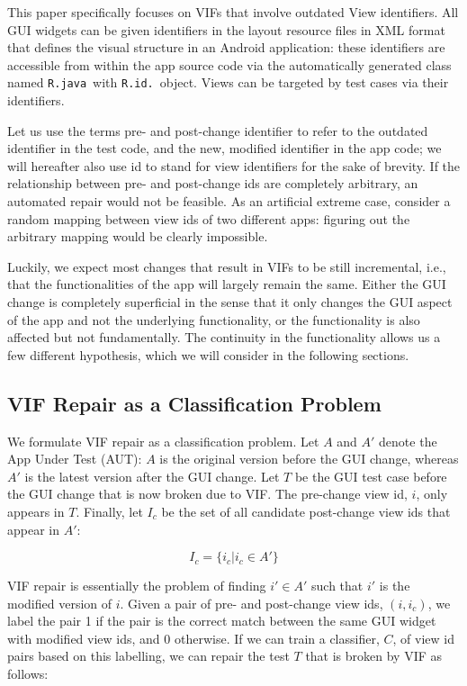 \documentclass[sigconf]{acmart}
\begin{document}
This paper specifically focuses on VIFs that involve outdated View
identifiers. All GUI widgets can be given identifiers in the layout resource files in XML format
that defines the visual structure in an Android application: these identifiers are accessible from within
the app source code via the automatically generated class named \lstinline+R.java+\ with \lstinline+R.id.+\ object. Views can be targeted by test cases via their identifiers.

Let us use the terms pre- and post-change identifier to refer to the outdated
identifier in the test code, and the new, modified identifier in the app code;
we will hereafter also use id to stand for view identifiers for the sake of
brevity. If the relationship between pre- and post-change ids are completely
arbitrary, an automated repair would not be feasible. As an artificial extreme
case, consider a random mapping between view ids of two different apps:
figuring out the arbitrary mapping would be clearly impossible.

Luckily, we expect most changes that result in VIFs to be still incremental,
i.e., that the functionalities of the app will largely remain the same. Either
the GUI change is completely superficial in the sense that it only changes the
GUI aspect of the app and not the underlying functionality, or the
functionality is also affected but not fundamentally. The continuity in the
functionality allows us a few different hypothesis, which we will consider in
the following sections.

\subsection{VIF Repair as a Classification Problem}
\label{sec:classification}

We formulate VIF repair as a classification problem. Let $A$ and $A'$ denote the App Under Test (AUT): $A$ is the original version before the GUI change, whereas $A'$ is the latest version after the GUI change. Let $T$ be the GUI test case before the GUI change that is now broken due to VIF. The pre-change view id, $i$, only appears in $T$. Finally, let $I_c$ be the set of all candidate post-change view ids that appear in $A'$:

\[I_c = \{i_c | i_c \in A'\}\]

VIF repair is essentially the problem of finding $i' \in A'$ such that $i'$ is
the modified version of $i$. Given a pair of pre- and post-change view ids,
$(i, i_c)$, we label the pair 1 if the pair is the correct match between the
same GUI widget with modified view ids, and 0 otherwise. If we can train a
classifier, $C$, of view id pairs based on this labelling, we can repair the
test $T$ that is broken by VIF as follows:
\end{document}
